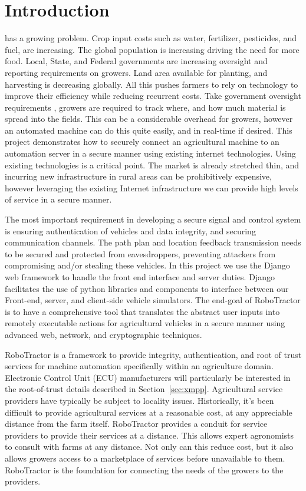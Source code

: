 \documentclass[conference,12pt]{IEEEtran}
\begin{document}
\section{Introduction}
 has a growing problem. Crop input costs such as water,
fertilizer, pesticides, and fuel, are increasing. The global population is
increasing driving the need for more food. Local, State, and Federal governments
are increasing oversight and reporting requirements on growers. Land area
available for planting, and harvesting is decreasing globally. All this pushes
farmers to rely on technology to improve their efficiency while reducing
recurrent costs. Take government oversight requirements
\autocite{_growers_oversight}, growers are required to track where, and how much
material is spread into the fields.  This can be a considerable overhead for
growers, however an automated machine can do this quite easily, and in real-time
if  desired.  This project demonstrates how to securely connect an agricultural
machine to an automation server in a secure manner using existing internet
technologies. Using existing technologies is a critical point. The market is
already stretched thin, and incurring new infrastructure in rural areas can be
prohibitively expensive, however leveraging the existing Internet infrastructure we
can provide high levels of service in a secure manner.

The most important requirement in developing a secure signal and control
system is ensuring authentication of vehicles and data integrity, and securing communication channels.
The path plan and location feedback transmission needs to be secured
and protected from eavesdroppers, preventing attackers from
compromising and/or stealing these vehicles. In this project we use
the Django web framework to handle the front end interface and server duties. 
Django facilitates the use of python libraries and components to interface between our Front-end, server, and client-side vehicle simulators.
The end-goal of RoboTractor is to have a comprehensive tool that
translates the abstract user inputs into remotely executable actions for
agricultural vehicles in a secure manner using advanced web, network, and cryptographic techniques.

RoboTractor is a framework to provide integrity, authentication, and root of
trust services for machine automation specifically within an agriculture domain.
Electronic Control Unit (ECU) manufacturers will particularly be interested in the root-of-trust details
described in Section~\ref{sec:xmpp}.  Agricultural service providers have
typically be subject to locality issues. Historically, it's been difficult to
provide agricultural services at a reasonable cost, at any appreciable distance
from the farm itself.  RoboTractor provides a conduit for service providers to
provide their services at a distance. This allows expert agronomists to consult
with farms at any distance.  Not only can this reduce cost, but it also allows
growers access to a marketplace of services before unavailable to them.
RoboTractor is the foundation for connecting the needs of the growers to the
providers.  
\end{document}
